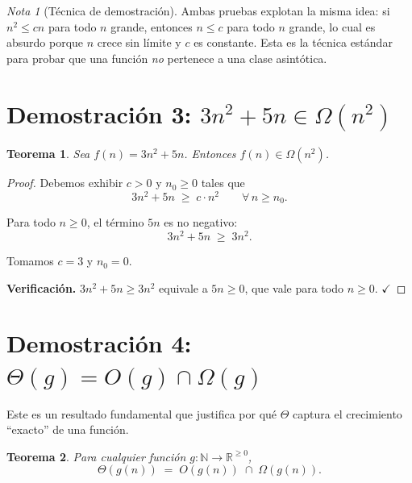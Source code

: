\documentclass[11pt, letterpaper]{article}
\theoremstyle{definition}
\theoremstyle{plain}
\newtheorem{theorem}{Teorema}[section]
\theoremstyle{remark}
\newtheorem*{remark}{Nota}
\begin{document}
\begin{remark}[Técnica de demostración]
  Ambas pruebas explotan la misma idea: si $n^2 \leq cn$ para todo
  $n$ grande, entonces $n \leq c$ para todo $n$ grande, lo cual es
  absurdo porque $n$ crece sin límite y $c$ es constante. Esta es la
  técnica estándar para probar que una función \emph{no} pertenece a
  una clase asintótica.
\end{remark}


\section{Demostración 3: \texorpdfstring{$3n^2 + 5n \in \Omega(n^2)$}{3n²+5n ∈ Ω(n²)}}

\begin{theorem}\label{thm:3n2-omega}
  Sea $f(n) = 3n^2 + 5n$. Entonces $f(n) \in \Omega(n^2)$.
\end{theorem}

\begin{proof}
  Debemos exhibir $c > 0$ y $n_0 \geq 0$ tales que
  \[
    3n^2 + 5n \;\geq\; c \cdot n^2 \qquad \forall\, n \geq n_0.
  \]

  Para todo $n \geq 0$, el término $5n$ es no negativo:
  \[
    3n^2 + 5n \;\geq\; 3n^2.
  \]

  Tomamos $c = 3$ y $n_0 = 0$.

  \textbf{Verificación.} $3n^2 + 5n \geq 3n^2$ equivale a $5n \geq 0$,
  que vale para todo $n \geq 0$. $\checkmark$
\end{proof}


\section{Demostración 4: \texorpdfstring{$\Theta(g) = O(g) \cap \Omega(g)$}{Θ(g) = O(g) ∩ Ω(g)}}
\label{sec:theta-equivalence}

Este es un resultado fundamental que justifica por qué $\Theta$ captura
el crecimiento ``exacto'' de una función.

\begin{theorem}\label{thm:theta-intersection}
  Para cualquier función $g : \mathbb{N} \to \mathbb{R}^{\geq 0}$,
  \[
    \Theta(g(n)) \;=\; O(g(n)) \;\cap\; \Omega(g(n)).
  \]
\end{theorem}
\end{document}
